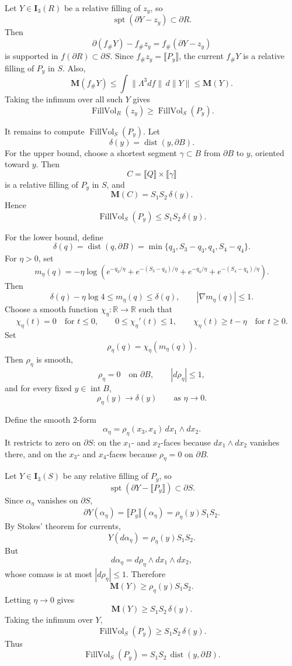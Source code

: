 Let \(Y\in \mathbf I_3(R)\) be a relative filling of \(z_y\), so
\[
\operatorname{spt}(\partial Y-z_y)\subset \partial R.
\]
Then
\[
\partial(f_\#Y)-f_\#z_y
=
f_\#(\partial Y-z_y)
\]
is supported in \(f(\partial R)\subset \partial S\). Since \(f_\#z_y=\llbracket P_y\rrbracket\), the current \(f_\#Y\) is a relative filling of \(P_y\) in \(S\). Also,
\[
\mathbf M(f_\#Y)\le \int \|\Lambda^3df\|\,d\|Y\|\le \mathbf M(Y).
\]
Taking the infimum over all such \(Y\) gives
\[
\operatorname{FillVol}_R(z_y)\ge \operatorname{FillVol}_S(P_y).
\]

It remains to compute \(\operatorname{FillVol}_S(P_y)\). Let
\[
\delta(y)=\operatorname{dist}(y,\partial B).
\]
For the upper bound, choose a shortest segment \(\gamma\subset B\) from \(\partial B\) to \(y\), oriented toward \(y\). Then
\[
C=\llbracket Q\rrbracket\times \llbracket \gamma\rrbracket
\]
is a relative filling of \(P_y\) in \(S\), and
\[
\mathbf M(C)=S_1S_2\,\delta(y).
\]
Hence
\[
\operatorname{FillVol}_S(P_y)\le S_1S_2\,\delta(y).
\]

For the lower bound, define
\[
\delta(q)=\operatorname{dist}(q,\partial B)
=
\min\{q_3,S_3-q_3,q_4,S_4-q_4\}.
\]
For \(\eta>0\), set
\[
m_\eta(q)
=
-\eta\log\left(
e^{-q_3/\eta}
+
e^{-(S_3-q_3)/\eta}
+
e^{-q_4/\eta}
+
e^{-(S_4-q_4)/\eta}
\right).
\]
Then
\[
\delta(q)-\eta\log 4\le m_\eta(q)\le \delta(q),
\qquad
|\nabla m_\eta(q)|\le 1.
\]
Choose a smooth function \(\chi_\eta:\mathbb R\to\mathbb R\) such that
\[
\chi_\eta(t)=0\quad\text{for }t\le 0,\qquad
0\le \chi_\eta'(t)\le 1,\qquad
\chi_\eta(t)\ge t-\eta\quad\text{for }t\ge 0.
\]
Set
\[
\rho_\eta(q)=\chi_\eta(m_\eta(q)).
\]
Then \(\rho_\eta\) is smooth,
\[
\rho_\eta=0\quad\text{on }\partial B,\qquad |d\rho_\eta|\le 1,
\]
and for every fixed \(y\in\operatorname{int}B\),
\[
\rho_\eta(y)\to \delta(y)
\qquad\text{as }\eta\to 0.
\]

Define the smooth \(2\)-form
\[
\alpha_\eta=\rho_\eta(x_3,x_4)\,dx_1\wedge dx_2.
\]
It restricts to zero on \(\partial S\): on the \(x_1\)- and \(x_2\)-faces because \(dx_1\wedge dx_2\) vanishes there, and on the \(x_3\)- and \(x_4\)-faces because \(\rho_\eta=0\) on \(\partial B\).

Let \(Y\in\mathbf I_3(S)\) be any relative filling of \(P_y\), so
\[
\operatorname{spt}(\partial Y-\llbracket P_y\rrbracket)\subset \partial S.
\]
Since \(\alpha_\eta\) vanishes on \(\partial S\),
\[
\partial Y(\alpha_\eta)
=
\llbracket P_y\rrbracket(\alpha_\eta)
=
\rho_\eta(y)S_1S_2.
\]
By Stokes’ theorem for currents,
\[
Y(d\alpha_\eta)=\rho_\eta(y)S_1S_2.
\]
But
\[
d\alpha_\eta=d\rho_\eta\wedge dx_1\wedge dx_2,
\]
whose comass is at most \(|d\rho_\eta|\le 1\). Therefore
\[
\mathbf M(Y)\ge \rho_\eta(y)S_1S_2.
\]
Letting \(\eta\to 0\) gives
\[
\mathbf M(Y)\ge S_1S_2\,\delta(y).
\]
Taking the infimum over \(Y\),
\[
\operatorname{FillVol}_S(P_y)\ge S_1S_2\,\delta(y).
\]
Thus
\[
\operatorname{FillVol}_S(P_y)=S_1S_2\,\operatorname{dist}(y,\partial B).
\]

